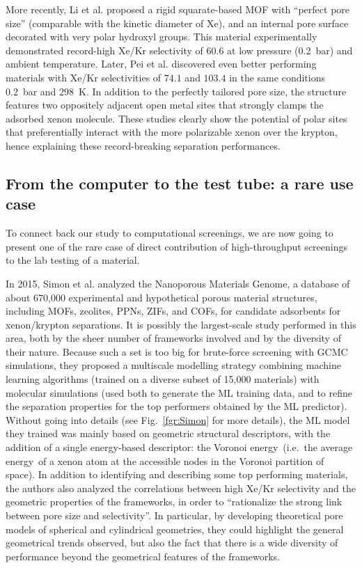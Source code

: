 \documentclass[main.tex]{subfiles}
\begin{document}
More recently, Li et al. proposed a rigid squarate-based MOF with ``perfect pore size'' (comparable with the kinetic diameter of Xe), and an internal pore surface decorated with very polar hydroxyl groups. This material experimentally demonstrated record-high Xe/Kr selectivity of $60.6$ at low pressure (\SI{0.2}{\bar}) and ambient temperature.\cite{Li_2019} Later, Pei et al. discovered even better performing materials with Xe/Kr selectivities of $74.1$ and $103.4$ in the same conditions \SI{0.2}{\bar} and \SI{298}{\kelvin}. In addition to the perfectly tailored pore size, the structure features two oppositely adjacent open metal sites that strongly clamps the adsorbed xenon molecule.\cite{Pei_2022} These studies clearly show the potential of polar sites that preferentially interact with the more polarizable xenon over the krypton, hence explaining these record-breaking separation performances. 

\subsection{From the computer to the test tube: a rare use case}
To connect back our study to computational screenings, we are now going to present one of the rare case of direct contribution of high-throughput screenings to the lab testing of a material. 

In 2015, Simon et al.\cite{Simon_2015} analyzed the Nanoporous Materials Genome,\cite{Simon_2015_EES, Boyd_2017} a database of about 670,000 experimental and hypothetical porous material structures, including MOFs, zeolites, PPNs, ZIFs, and COFs, for candidate adsorbents for xenon/krypton separations. It is possibly the largest-scale study performed in this area, both by the sheer number of frameworks involved and by the diversity of their nature. Because such a set is too big for brute-force screening with GCMC simulations, they proposed a multiscale modelling strategy combining machine learning algorithms (trained on a diverse subset of 15,000 materials) with molecular simulations (used both to generate the ML training data, and to refine the separation properties for the top performers obtained by the ML predictor). Without going into details (see Fig.~\ref{fgr:Simon} for more details), the ML model they trained was mainly based on geometric structural descriptors, with the addition of a single energy-based descriptor: the Voronoi energy\ (i.e.\ the average energy\ of a xenon atom at the accessible nodes in the Voronoi partition of space). In addition to identifying and describing some top performing materials, the authors also analyzed the correlations between high Xe/Kr selectivity and the geometric properties of the frameworks, in order to ``rationalize the strong link between pore size and selectivity''. In particular, by developing theoretical pore models of spherical and cylindrical geometries, they could highlight the general geometrical trends observed, but also the fact that there is a wide diversity of performance beyond the geometrical features of the frameworks.
\end{document}
